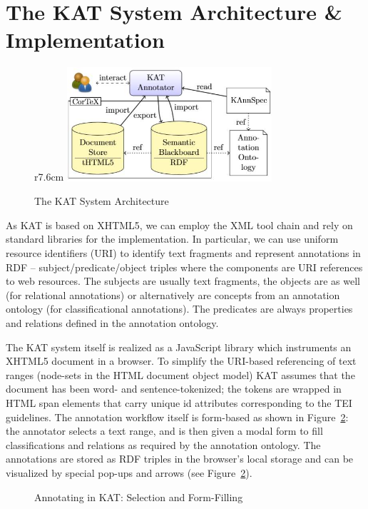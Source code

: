 \section{The KAT System Architecture \& Implementation}

\begin{figure}r{7.6cm}\vspace*{-2em}
  \includegraphics[width=7.6cm]{img/arch}
  \caption{The KAT System Architecture}\label{fig:kat-arch}\vspace*{-1em}
\end{figure}


As KAT is based on XHTML5, we can employ the XML tool chain and rely on standard libraries for the implementation. In particular, we can use uniform resource identifiers (URI) to identify text fragments and represent annotations in RDF -- subject/predicate/object triples where the components are URI references to web resources. The subjects are usually text fragments, the objects are as well (for relational annotations) or alternatively are concepts from an annotation ontology (for classificational annotations). The predicates are always properties and relations defined in the annotation ontology.

The KAT system itself is realized as a JavaScript library which instruments an XHTML5 document in a browser. To simplify the URI-based referencing of text ranges (node-sets in the HTML document object model) KAT assumes that the document has been word- and sentence-tokenized; the tokens are wrapped in HTML \textsf{span} elements that carry unique \textsf{id} attributes corresponding to the TEI guidelines. The annotation workflow itself is form-based as shown in Figure~\ref{fig:kat-annotate}: the annotator selects a text range, and is then given a modal form to fill classifications and relations as required by the annotation ontology. The annotations are stored as RDF triples in the browser's local storage and can be visualized by special pop-ups and arrows (see Figure~\ref{fig:kat-annotate}).

\begin{figure}[ht]\centering
  \caption{Annotating in KAT: Selection and Form-Filling}\label{fig:kat-annotate}
\end{figure}

